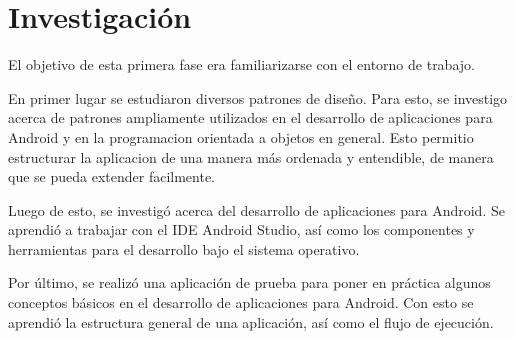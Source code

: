 \section{Investigación} \label{sect:Investigacion}

El objetivo de esta primera fase era familiarizarse con el entorno de trabajo.

En primer lugar se estudiaron diversos patrones de diseño. Para esto, se investigo acerca de patrones ampliamente utilizados en el desarrollo de aplicaciones para Android y en la programacion orientada a objetos en general. Esto permitio estructurar la aplicacion de una manera más ordenada y entendible, de manera que se pueda extender facilmente.

Luego de esto, se investigó acerca del desarrollo de aplicaciones para Android. Se aprendió a trabajar con el IDE Android Studio, así como los componentes y herramientas para el desarrollo bajo el sistema operativo.

Por último, se realizó una aplicación de prueba para poner en práctica algunos conceptos básicos en el desarrollo de aplicaciones para Android. Con esto se aprendió la estructura general de una aplicación, así como el flujo de ejecución.


